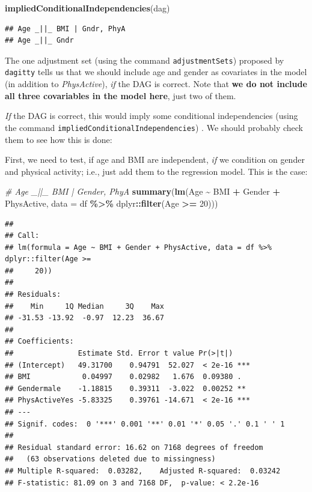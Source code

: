 \documentclass[
]{book}
\newenvironment{Shaded}{\begin{snugshade}}{\end{snugshade}}
\newcommand{\AttributeTok}[1]{\textcolor[rgb]{0.13,0.29,0.53}{#1}}
\newcommand{\CommentTok}[1]{\textcolor[rgb]{0.56,0.35,0.01}{\textit{#1}}}
\newcommand{\DecValTok}[1]{\textcolor[rgb]{0.00,0.00,0.81}{#1}}
\newcommand{\FunctionTok}[1]{\textcolor[rgb]{0.13,0.29,0.53}{\textbf{#1}}}
\newcommand{\NormalTok}[1]{#1}
\newcommand{\SpecialCharTok}[1]{\textcolor[rgb]{0.81,0.36,0.00}{\textbf{#1}}}
\begin{document}
\begin{Shaded}
\begin{Highlighting}[]
\FunctionTok{impliedConditionalIndependencies}\NormalTok{(dag)}
\end{Highlighting}
\end{Shaded}

\begin{verbatim}
## Age _||_ BMI | Gndr, PhyA
## Age _||_ Gndr
\end{verbatim}

The one adjustment set (using the command \texttt{adjustmentSets}) proposed by \texttt{dagitty} tells us that
we should include age and gender as covariates in the model (in addition to \emph{PhysActive}),
\emph{if} the DAG is correct.
Note that \textbf{we do not include all three covariables in the model here}, just two of them.

\emph{If} the DAG is correct, this would imply some conditional independencies
(using the command \texttt{impliedConditionalIndependencies}) .
We should probably check them to see how this is done:

First, we need to test, if age and BMI are independent,
\emph{if} we condition on gender and physical activity;
i.e., just add them to the regression model.
This is the case:

\begin{Shaded}
\begin{Highlighting}[]
\CommentTok{\# Age \_||\_ BMI | Gender, PhyA}
\FunctionTok{summary}\NormalTok{(}\FunctionTok{lm}\NormalTok{(Age }\SpecialCharTok{\textasciitilde{}}\NormalTok{ BMI }\SpecialCharTok{+}\NormalTok{ Gender }\SpecialCharTok{+}\NormalTok{ PhysActive, }\AttributeTok{data =}\NormalTok{ df }\SpecialCharTok{\%\textgreater{}\%}\NormalTok{ dplyr}\SpecialCharTok{::}\FunctionTok{filter}\NormalTok{(Age }\SpecialCharTok{\textgreater{}=} \DecValTok{20}\NormalTok{)))}
\end{Highlighting}
\end{Shaded}

\begin{verbatim}
## 
## Call:
## lm(formula = Age ~ BMI + Gender + PhysActive, data = df %>% dplyr::filter(Age >= 
##     20))
## 
## Residuals:
##    Min     1Q Median     3Q    Max 
## -31.53 -13.92  -0.97  12.23  36.67 
## 
## Coefficients:
##               Estimate Std. Error t value Pr(>|t|)    
## (Intercept)   49.31700    0.94791  52.027  < 2e-16 ***
## BMI            0.04997    0.02982   1.676  0.09380 .  
## Gendermale    -1.18815    0.39311  -3.022  0.00252 ** 
## PhysActiveYes -5.83325    0.39761 -14.671  < 2e-16 ***
## ---
## Signif. codes:  0 '***' 0.001 '**' 0.01 '*' 0.05 '.' 0.1 ' ' 1
## 
## Residual standard error: 16.62 on 7168 degrees of freedom
##   (63 observations deleted due to missingness)
## Multiple R-squared:  0.03282,    Adjusted R-squared:  0.03242 
## F-statistic: 81.09 on 3 and 7168 DF,  p-value: < 2.2e-16
\end{verbatim}
\end{document}
